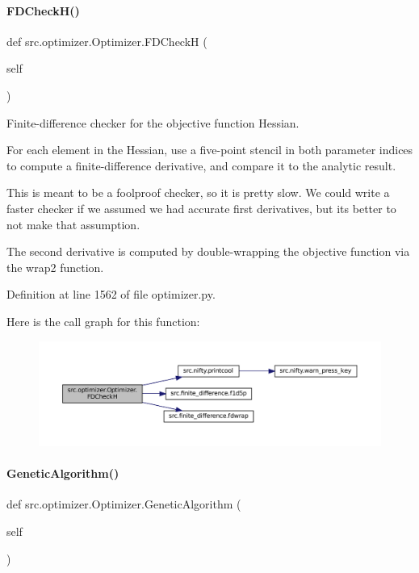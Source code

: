 \paragraph{\texorpdfstring{F\+D\+Check\+H()}{FDCheckH()}}
{\footnotesize\ttfamily def src.\+optimizer.\+Optimizer.\+F\+D\+CheckH (\begin{DoxyParamCaption}\item[{}]{self }\end{DoxyParamCaption})}



Finite-\/difference checker for the objective function Hessian. 

For each element in the Hessian, use a five-\/point stencil in both parameter indices to compute a finite-\/difference derivative, and compare it to the analytic result.

This is meant to be a foolproof checker, so it is pretty slow. We could write a faster checker if we assumed we had accurate first derivatives, but it\textquotesingle{}s better to not make that assumption.

The second derivative is computed by double-\/wrapping the objective function via the \textquotesingle{}wrap2\textquotesingle{} function. 

Definition at line 1562 of file optimizer.\+py.

Here is the call graph for this function\+:
\nopagebreak
\begin{figure}[H]
\begin{center}
\leavevmode
\includegraphics[width=350pt]{classsrc_1_1optimizer_1_1Optimizer_a9e68121016fa389cc2517d05e4286a6e_cgraph}
\end{center}
\end{figure}
\mbox{\label{classsrc_1_1optimizer_1_1Optimizer_a3948891ba042abccf4c6e111f3ce50be}} 
\paragraph{\texorpdfstring{Genetic\+Algorithm()}{GeneticAlgorithm()}}
{\footnotesize\ttfamily def src.\+optimizer.\+Optimizer.\+Genetic\+Algorithm (\begin{DoxyParamCaption}\item[{}]{self }\end{DoxyParamCaption})}




